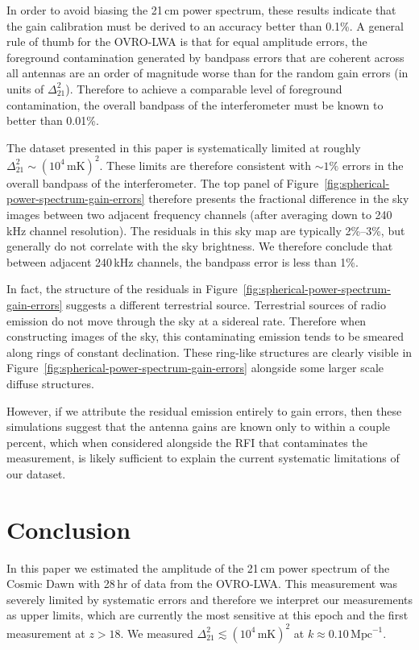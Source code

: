 \begin{bibunit}
In order to avoid biasing the 21\,cm power spectrum, these results indicate that the gain
calibration must be derived to an accuracy better than 0.1\%.  A general rule of thumb for the
OVRO-LWA is that for equal amplitude errors, the foreground contamination generated by bandpass
errors that are coherent across all antennas are an order of magnitude worse than for the random
gain errors (in units of $\Delta_{21}^2$). Therefore to achieve a comparable level of foreground
contamination, the overall bandpass of the interferometer must be known to better than 0.01\%.

The dataset presented in this paper is systematically limited at roughly $\Delta_{21}^2 \sim
(10^4\,\text{mK})^2$. These limits are therefore consistent with $\sim 1\%$ errors in the overall
bandpass of the interferometer. The top panel of
Figure~\ref{fig:spherical-power-spectrum-gain-errors} therefore presents the fractional difference
in the sky images between two adjacent frequency channels (after averaging down to 240\,kHz channel
resolution). The residuals in this sky map are typically 2\%--3\%, but generally do not correlate
with the sky brightness. We therefore conclude that between adjacent 240\,kHz channels, the bandpass
error is less than 1\%.

In fact, the structure of the residuals in Figure~\ref{fig:spherical-power-spectrum-gain-errors}
suggests a different terrestrial source. Terrestrial sources of radio emission do not move through
the sky at a sidereal rate. Therefore when constructing images of the sky, this contaminating
emission tends to be smeared along rings of constant declination. These ring-like structures are
clearly visible in Figure~\ref{fig:spherical-power-spectrum-gain-errors} alongside some larger scale
diffuse structures.

However, if we attribute the residual emission entirely to gain errors, then these simulations
suggest that the antenna gains are known only to within a couple percent, which when considered
alongside the RFI that contaminates the measurement, is likely sufficient to explain the current
systematic limitations of our dataset.

\section{Conclusion}\label{sec:conclusion}

In this paper we estimated the amplitude of the 21\,cm power spectrum of the Cosmic Dawn with 28\,hr
of data from the OVRO-LWA. This measurement was severely limited by systematic errors and therefore
we interpret our measurements as upper limits, which are currently the most sensitive at this epoch
and the first measurement at $z > 18$. We measured $\Delta_{21}^2 \lesssim (10^4\,\text{mK})^2$ at
$k \approx 0.10\,\text{Mpc}^{-1}$.


\end{bibunit}
